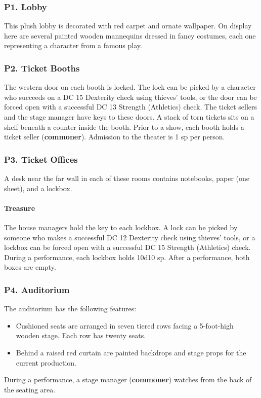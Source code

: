 \documentclass[10pt,a4paper,twoside,twocolumn,openany,nodeprecatedcode]{dndbook}
\begin{document}
\subsubsection{P1. Lobby}
This plush lobby is decorated with red carpet and ornate wallpaper. On display here are several painted wooden mannequins dressed in fancy costumes, each one representing a character from a famous play.
\subsubsection{P2. Ticket Booths}
The western door on each booth is locked. The lock can be picked by a character who succeeds on a DC 15 Dexterity check using thieves' tools, or the door can be forced open with a successful DC 13 Strength (Athletics) check. The ticket sellers and the stage manager have keys to these doors.
A stack of torn tickets sits on a shelf beneath a counter inside the booth. Prior to a show, each booth holds a ticket seller (\textbf{commoner}). Admission to the theater is 1 sp per person.
\subsubsection{P3. Ticket Offices}
A desk near the far wall in each of these rooms contains notebooks, paper (one sheet), and a lockbox.
\paragraph{Treasure}
The house managers hold the key to each lockbox. A lock can be picked by someone who makes a successful DC 12 Dexterity check using thieves' tools, or a lockbox can be forced open with a successful DC 15 Strength (Athletics) check. During a performance, each lockbox holds 10d10 sp. After a performance, both boxes are empty.
\subsubsection{P4. Auditorium}
The auditorium has the following features:
\begin{itemize}

\item Cushioned seats are arranged in seven tiered rows facing a 5-foot-high wooden stage. Each row has twenty seats.
\item Behind a raised red curtain are painted backdrops and stage props for the current production.
\end{itemize}


During a performance, a stage manager (\textbf{commoner}) watches from the back of the seating area.
\end{document}
